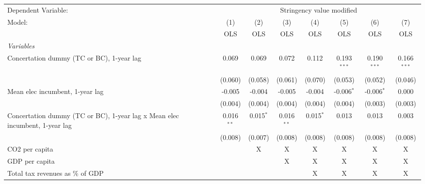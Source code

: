 
\begingroup
\centering
\begin{tabular}{lccccccc}
   \toprule
   Dependent Variable: & \multicolumn{7}{c}{Stringency value modified}\\
   Model:                                                                      & (1)          & (2)         & (3)          & (4)         & (5)           & (6)           & (7)\\  
                                                                               &  OLS         & OLS         & OLS          & OLS         & OLS           & OLS           & OLS\\  
   \midrule
   \emph{Variables}\\
   Concertation dummy (TC or BC), 1-year lag                                   & 0.069        & 0.069       & 0.072        & 0.112       & 0.193$^{***}$ & 0.190$^{***}$ & 0.166$^{***}$\\   
                                                                               & (0.060)      & (0.058)     & (0.061)      & (0.070)     & (0.053)       & (0.052)       & (0.046)\\   
   Mean elec incumbent, 1-year lag                                             & -0.005       & -0.004      & -0.005       & -0.004      & -0.006$^{*}$  & -0.006$^{*}$  & 0.000\\   
                                                                               & (0.004)      & (0.004)     & (0.004)      & (0.004)     & (0.004)       & (0.003)       & (0.003)\\   
   Concertation dummy (TC or BC), 1-year lag x Mean elec incumbent, 1-year lag & 0.016$^{**}$ & 0.015$^{*}$ & 0.016$^{**}$ & 0.015$^{*}$ & 0.013         & 0.013         & 0.003\\   
                                                                               & (0.008)      & (0.007)     & (0.008)      & (0.008)     & (0.008)       & (0.008)       & (0.008)\\   
   CO2 per capita                                                              &              & X           & X            & X           & X             & X             & X\\  
   GDP per capita                                                              &              &             & X            & X           & X             & X             & X\\  
   Total tax revenues as \% of GDP                                             &              &             &              & X           & X             & X             & X\\  

\end{tabular}
